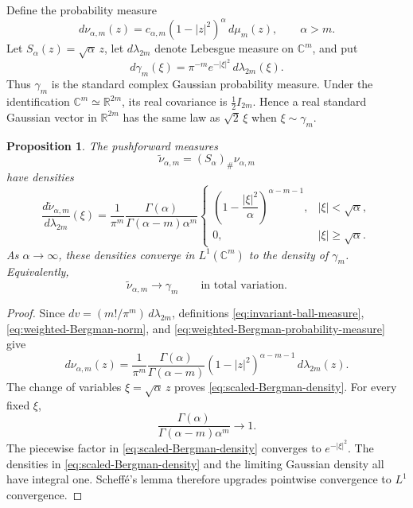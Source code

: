 \documentclass[11pt,reqno]{amsart}
\numberwithin{equation}{section}
\newtheorem{proposition}[theorem]{Proposition}
\theoremstyle{definition}
\theoremstyle{remark}
\begin{document}
Define the probability measure
\begin{equation}
 d\nu_{\alpha,m}(z)
 =
 c_{\alpha,m}(1-|z|^2)^\alpha\,d\mu_m(z),
 \qquad \alpha>m.
 \label{eq:weighted-Bergman-probability-measure}
\end{equation}
Let \(S_\alpha(z)=\sqrt{\alpha}\,z\), let
\(d\lambda_{2m}\) denote Lebesgue measure on \(\mathbb C^m\), and put
\[
 d\gamma_m(\xi)
 =
 \pi^{-m}e^{-|\xi|^2}\,d\lambda_{2m}(\xi).
\]
Thus \(\gamma_m\) is the standard complex Gaussian probability measure.
Under the identification \(\mathbb C^m\simeq\mathbb R^{2m}\), its real
covariance is \(\tfrac12 I_{2m}\).  Hence a real standard Gaussian vector in \(\mathbb R^{2m}\) has the same law as
\(\sqrt2\,\xi\) when \(\xi\sim\gamma_m\).

\begin{proposition}
\label{prop:Bergman-to-Gaussian-scaling}
The pushforward measures
\[
 \widetilde\nu_{\alpha,m}
 =
 (S_\alpha)_\#\nu_{\alpha,m}
\]
have densities
\begin{equation}
 \frac{d\widetilde\nu_{\alpha,m}}{d\lambda_{2m}}(\xi)
 =
 \frac{1}{\pi^m}
 \frac{\Gamma(\alpha)}{\Gamma(\alpha-m)\alpha^m}
 \begin{cases}
 \left(1-\dfrac{|\xi|^2}{\alpha}\right)^{\alpha-m-1},
 & |\xi|<\sqrt\alpha,\\[4pt]
 0,& |\xi|\ge\sqrt\alpha.
 \end{cases}
 \label{eq:scaled-Bergman-density}
\end{equation}
As \(\alpha\to\infty\), these densities converge in
\(L^1(\mathbb C^m)\) to the density of \(\gamma_m\).  Equivalently,
\[
 \widetilde\nu_{\alpha,m}
 \longrightarrow
 \gamma_m
 \qquad\text{in total variation}.
\]
\end{proposition}

\begin{proof}
Since \(dv=(m!/\pi^m)\,d\lambda_{2m}\), definitions
\eqref{eq:invariant-ball-measure},
\eqref{eq:weighted-Bergman-norm}, and
\eqref{eq:weighted-Bergman-probability-measure} give
\[
 d\nu_{\alpha,m}(z)
 =
 \frac{1}{\pi^m}
 \frac{\Gamma(\alpha)}{\Gamma(\alpha-m)}
 (1-|z|^2)^{\alpha-m-1}\,d\lambda_{2m}(z).
\]
The change of variables \(\xi=\sqrt{\alpha}\,z\) proves
\eqref{eq:scaled-Bergman-density}.  For every fixed \(\xi\),
\[
 \frac{\Gamma(\alpha)}{\Gamma(\alpha-m)\alpha^m}
 \longrightarrow1.
\]
The piecewise factor in \eqref{eq:scaled-Bergman-density} converges to
\(e^{-|\xi|^2}\).
The densities in \eqref{eq:scaled-Bergman-density} and the limiting
Gaussian density all have integral one.  Scheff\'e's lemma therefore
upgrades pointwise convergence to \(L^1\) convergence.
\end{proof}
\end{document}
